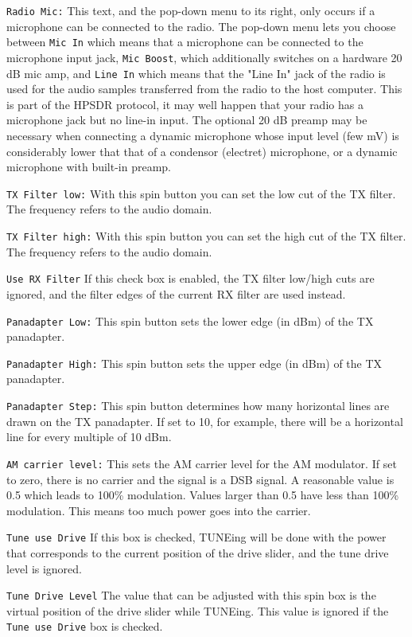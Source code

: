 \documentclass[12pt]{book}
\def\rett#1{\texttt{\color{red}#1}}
\begin{document}
\rett{Radio Mic:} This text, and the pop-down menu to its right, only occurs if a microphone can
be connected to the radio. The pop-down menu lets you choose between \rett{Mic In} which means
that a microphone can be connected to the microphone input jack, \rett{Mic Boost}, which
additionally switches on a hardware 20 dB mic amp, and \rett{Line In} which means that the
"Line In" jack of the radio is used for the audio samples transferred from the radio to the
host computer. This is part of the HPSDR protocol, it may well happen that your radio has a
microphone jack but no line-in input. The optional 20 dB preamp may be necessary when connecting
a dynamic microphone whose input level (few mV) is considerably lower that that of a
condensor (electret) microphone, or a dynamic microphone with built-in preamp.

\rett{TX Filter low:} With this spin button you can set the low cut of the TX filter. The
frequency refers to the audio domain.

\rett{TX Filter high:} With this spin button you can set the high cut of the TX filter. The
frequency refers to the audio domain.

\rett{Use RX Filter} If this check box is enabled, the TX filter low/high cuts are ignored,
and the filter edges of the current RX filter are used instead.

\rett{Panadapter Low:} This spin button sets the lower edge (in dBm) of the TX panadapter.

\rett{Panadapter High:} This spin button sets the upper edge (in dBm) of the TX panadapter.

\rett{Panadapter Step:} This spin button determines how many horizontal lines are drawn on the
TX panadapter. If set to 10, for example, there will be a horizontal line for every multiple
of 10 dBm.

\rett{AM carrier level:} This sets the AM carrier level for the AM modulator. If set to zero, there is no
carrier and the
signal is a DSB signal. A reasonable value is 0.5 which leads to 100\% modulation. Values larger than
0.5 have less than 100\% modulation. This means too much power goes into the carrier.

\rett{Tune use Drive} If this box is checked, TUNEing will be done with the power that corresponds to the
current position of the drive slider, and the tune drive level is ignored.

\rett{Tune Drive Level} The value that can be adjusted with this spin box is the virtual position of the
drive slider while TUNEing. This value is ignored if the \rett{Tune use Drive} box is checked.
\end{document}
